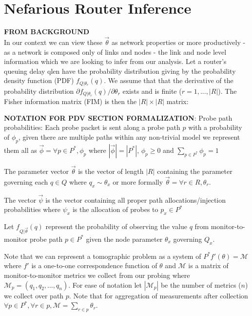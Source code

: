 \section{Nefarious Router Inference}
\label{sec:Mnetworkprobing}
    \begin{mdframed}\textbf{FROM BACKGROUND}\\
    In our context we can view these $\vec{\theta}$ as network properties or more productively - as a network is composed only of links and nodes - the link  and node level information which we are looking to infer from our analysis.
    Let a router's queuing delay \gls{qlen} have the probability distribution giving by the probability density function (PDF) $f_{Q|\theta_r}(q)$. We assume that that the derivative of the probability distribution $\partial f_{Q|\theta_r}(q)/\partial \theta_r$ exists and is finite (\ie $r = 1, ..., |R|$). The Fisher information matrix (FIM) is then the $|R|\times |R|$ matrix:

    \textbf{NOTATION FOR PDV SECTION FORMALIZATION}:
    Probe path probabilities: Each probe packet is sent along a probe path $p$ with a probability of $\phi_p$, given there are multiple paths within any non-trivial model we represent them all as $\vec{\phi}=\forall p\in P^*, \phi_p$ where $|\vec{\phi}|=|P^*|$, $\phi_p \geq 0$ and $\sum_{p\in P^*}\phi_p = 1$
    
    The parameter vector $\vec{\theta}$ is the vector of length $|R|$ containing the parameter governing each $q\in Q$ where $ q_x \sim \theta_x$ or more formally $\vec{\theta}=\forall r\in R, \theta_r$.
    
    The vector $\vec{\psi}$ is the vector containing all proper path allocations/injection probabilities where $\psi_x$ is the allocation of probes to $p_x\in P^*$ 
    
    Let $f_{Q|\vec{\theta}}(q)$ represent the probability of observing the value $q$ from monitor-to-monitor probe path $p\in P^*$ given the node parameter $\theta_x$ governing $Q_x$.
    
    Note that we can represent a tomographic problem as a system of $P^*f'(\theta)=\mathcal{M}$ where $f'$ is a one-to-one correspondence function of $\theta$ and $\mathcal{M}$ is a matrix of monitor-to-monitor metrics we collect from our probing where $\mathcal{M}_p = (q_1,q_2,\ldots, q_n)$. For ease of notation let $|\mathcal{M}_p|$ be the number of metrics ($n$) we collect over path $p$. Note that for aggregation of measurements after collection $\forall p\in P^*, \forall r\in p, \mathcal{M}=\sum_{r\in p}\theta_r$.
\end{mdframed}

